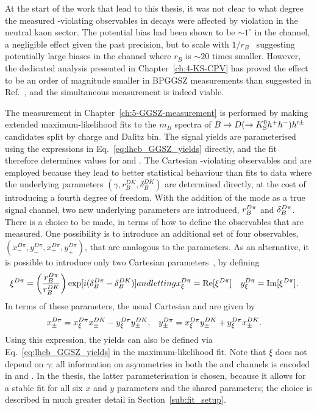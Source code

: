 At the start of the work that lead to this thesis, it was not clear to what degree the measured \CP-violating observables in \BtoDpi decays were affected by \CP violation in the neutral kaon sector. The potential bias had been shown to be $\sim1^\circ$ in the \BtoDK channel, a negligible effect given the past precision, but to scale with $1/r_B$~\cite{grossmanEffectsBarMixing2014} suggesting potentially large biases in the \BtoDpi channel where $r_B$ is $\sim20$ times smaller. However, the dedicated analysis presented in Chapter~\ref{ch:4-KS-CPV} has proved the effect to be an order of magnitude smaller in BPGGSZ measurements than suggested in Ref.~\cite{grossmanEffectsBarMixing2014}, and the simultaneous measurement is indeed viable. 

The measurement in Chapter~\ref{ch:5-GGSZ-measurement} is performed by making extended maximum-likelihood fits to the $m_B$ spectra of ${B}\rightarrow{\ensuremath{D}}(\rightarrow{\ensuremath{{K}^0_{\mathrm{S}}}} h^+h^-)h'^\pm$ candidates split by charge and Dalitz bin. The \BtoDK signal yields are parameterised using the expressions in Eq.~\eqref{eq:lhcb_GGSZ_yields} directly, and the fit therefore determines values for \xpmdk and \ypmdk. The Cartesian \CP-violating observables \xpm and \ypm are employed because they lead to better statistical behaviour than fits to data where the underlying parameters $(\gamma, r_B^{DK}, \delta_B^{DK})$ are determined directly, at the cost of introducing a fourth degree of freedom. With the addition of the \BtoDpi mode as a true signal channel, two new underlying parameters are introduced, $r_B^{{D}\pi}$ and $\delta_B^{{D}\pi}$. There is a choice to be made, in terms of how to define the observables that are measured. One possibility is to introduce an additional set of four observables, $(x_-^{D\pi}, y_-^{D\pi}, x_+^{D\pi}, y_+^{D\pi})$, that are analogous to the \BtoDK parameters. As an alternative, it is possible to introduce only two Cartesian parameters~\cite{Tico:2018qmg,JordiXi2}, by defining
\begin{subequations}
\begin{align}
    \xi^{\D\pi} = \left(\frac{r_B^{\D\pi}}{r_B^{DK}}\right)\exp [i (\delta_B^{\D\pi}-\delta_B^{DK})]
\end{align}
and letting
\begin{align}
    \xxidpi &= \Re [\xi^{\D\pi}] & \yxidpi &= \Im [\xi^{\D\pi}].
\end{align}
\end{subequations}
In terms of these parameters, the usual Cartesian \xpm and \ypm are given by
\begin{align}\label{eq:xy_from_xi}
    x_\pm^{{D}\pi} &= x_\xi^{{D}\pi}x_\pm^{DK} - y_\xi^{{D}\pi}y_\pm^{DK}, 
    & y_\pm^{{D}\pi} &= x_\xi^{{D}\pi}y_\pm^{DK} + y_\xi^{{D}\pi}x_\pm^{DK}.
\end{align} 
Using this expression, the \BtoDpi yields can also be defined via Eq.~\eqref{eq:lhcb_GGSZ_yields} in the maximum-likelihood fit. Note that $\xi$ does not depend on $\gamma$: all information on \CP asymmetries in both the \BtoDK and \BtoDpi channels is encoded in \xpmdk and \ypmdk. In the thesis, the latter parameterisation is chosen, because it allows for a stable fit for all six $x$ and $y$ parameters and the shared \Fi parameters; the choice is described in much greater detail in Section~\ref{sub:fit_setup}. 

